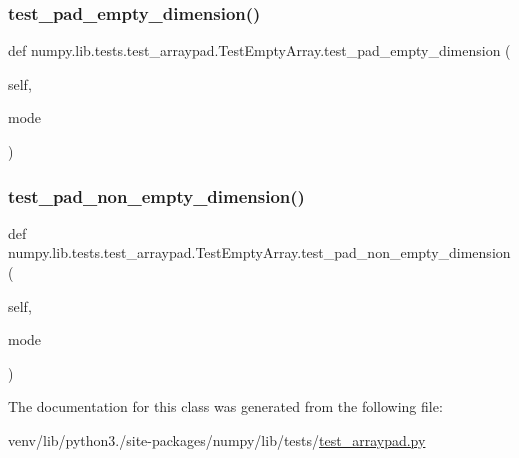 \subsubsection{\texorpdfstring{test\+\_\+pad\+\_\+empty\+\_\+dimension()}{test\_pad\_empty\_dimension()}}
{\footnotesize\ttfamily def numpy.\+lib.\+tests.\+test\+\_\+arraypad.\+Test\+Empty\+Array.\+test\+\_\+pad\+\_\+empty\+\_\+dimension (\begin{DoxyParamCaption}\item[{}]{self,  }\item[{}]{mode }\end{DoxyParamCaption})}

\mbox{\label{classnumpy_1_1lib_1_1tests_1_1test__arraypad_1_1TestEmptyArray_a58453a2c5df5ed64480fd28254a8d91a}} 
\subsubsection{\texorpdfstring{test\+\_\+pad\+\_\+non\+\_\+empty\+\_\+dimension()}{test\_pad\_non\_empty\_dimension()}}
{\footnotesize\ttfamily def numpy.\+lib.\+tests.\+test\+\_\+arraypad.\+Test\+Empty\+Array.\+test\+\_\+pad\+\_\+non\+\_\+empty\+\_\+dimension (\begin{DoxyParamCaption}\item[{}]{self,  }\item[{}]{mode }\end{DoxyParamCaption})}



The documentation for this class was generated from the following file\+:\begin{DoxyCompactItemize}
\item 
venv/lib/python3./site-\/packages/numpy/lib/tests/\hyperlink{test__arraypad_8py}{test\+\_\+arraypad.\+py}\end{DoxyCompactItemize}
